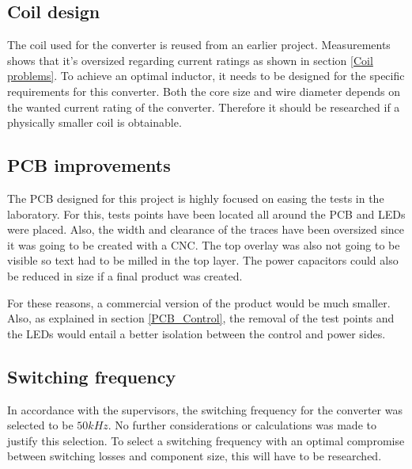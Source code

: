 
\subsection{Coil design}
The coil used for the converter is reused from an earlier project. Measurements shows that it's oversized regarding current ratings as shown in section \ref{Coil problems}. To achieve an optimal inductor, it needs to be designed for the specific requirements for this converter. Both the core size and wire diameter depends on the wanted current rating of the converter\cite{underthehood}. Therefore it should be researched if a physically smaller coil is obtainable.
\subsection{PCB improvements}
The PCB designed for this project is highly focused on easing the tests in the laboratory. For this, tests points have been located all around the PCB and LEDs were placed. Also, the width and clearance of the traces have been oversized since it was going to be created with a CNC. The top overlay was also not going to be visible so text had to be milled in the top layer. The power capacitors could also be reduced in size if a final product was created.

For these reasons, a commercial version of the product would be much smaller. Also, as explained in section \ref{PCB_Control}, the removal of the test points and the LEDs would entail a better isolation between the control and power sides.

\subsection{Switching frequency}
In accordance with the supervisors, the switching frequency for the converter was selected to be $50kHz$. No further considerations or calculations was made to justify this selection. To select a switching frequency with an optimal compromise between switching losses and component size, this will have to be researched. 



